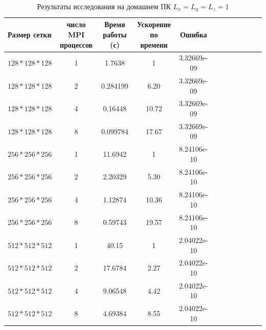\documentclass{article}
\begin{document}
        \begin{table}[!t]
        \centering
        \caption{Результаты исследования на домашнем ПК \(L_x = L_y = L_z = 1\)}\label{tab:tab1}
        \begin{tabularx}{\textwidth}{@{}l*{10}{C}c@{}} %
            \toprule
            \bf Размер сетки & \bf число MPI процессов  & \bf Время работы (с) & \bf Ускорение по времени & \bf Ошибка \\
                \midrule
                \(128*128*128\) & 1 & 1.7638   & 1     & 3.32669e-09\\
                \(128*128*128\) & 2 & 0.284199 & 6.20  & 3.32669e-09\\
                \(128*128*128\) & 4 & 0.16448  & 10.72 & 3.32669e-09\\
                \(128*128*128\) & 8 & 0.099784 & 17.67 & 3.32669e-09\\
                \midrule
                \(256*256*256\) & 1 & 11.6942 & 1     & 8.24106e-10 \\
                \(256*256*256\) & 2 & 2.20329 & 5.30  & 8.24106e-10 \\
                \(256*256*256\) & 4 & 1.12874 & 10.36 & 8.24106e-10 \\
                \(256*256*256\) & 8 & 0.59743 & 19.57 & 8.24106e-10 \\
                \midrule
                \(512*512*512\) & 1 & 40.15   & 1      & 2.04022e-10 \\
                \(512*512*512\) & 2 & 17.6784 & 2.27   & 2.04022e-10 \\
                \(512*512*512\) & 4 & 9.06548 & 4.42   & 2.04022e-10 \\
                \(512*512*512\) & 8 & 4.69384 & 8.55   & 2.04022e-10 \\
                \bottomrule
            \end{tabularx}
        \end{table}
\end{document}

